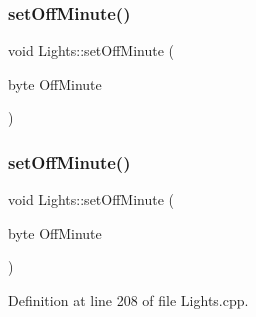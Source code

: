 \mbox{\label{class_lights_a922d225ef5a95478c3a8396f49685c77}} 
\subsubsection{\texorpdfstring{set\+Off\+Minute()}{setOffMinute()}\hspace{0.1cm}{\footnotesize\ttfamily [1/2]}}
{\footnotesize\ttfamily void Lights\+::set\+Off\+Minute (\begin{DoxyParamCaption}\item[{byte}]{Off\+Minute }\end{DoxyParamCaption})\hspace{0.3cm}{\ttfamily [protected]}}

\mbox{\label{class_lights_a922d225ef5a95478c3a8396f49685c77}} 
\subsubsection{\texorpdfstring{set\+Off\+Minute()}{setOffMinute()}\hspace{0.1cm}{\footnotesize\ttfamily [2/2]}}
{\footnotesize\ttfamily void Lights\+::set\+Off\+Minute (\begin{DoxyParamCaption}\item[{byte}]{Off\+Minute }\end{DoxyParamCaption})\hspace{0.3cm}{\ttfamily [protected]}}



Definition at line 208 of file Lights.\+cpp.

